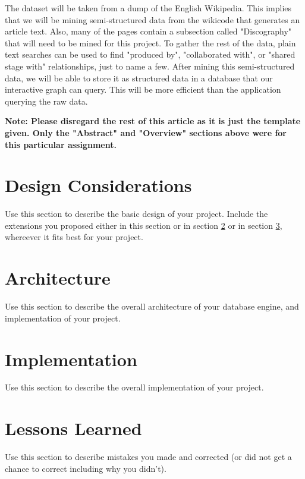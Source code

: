 \documentclass{sig-alternate}
\begin{document}
The dataset will be taken from a dump of the English Wikipedia. This implies 
that we will be mining semi-structured data from the wikicode that generates an 
article text. Also, many of the pages contain a subsection called "Discography" 
that will need to be mined for this project. To gather the rest of the data, 
plain text searches can be used to find "produced by", "collaborated with", 
or "shared stage with" relationships, just to name a few. After mining this 
semi-structured data, we will be able to store it as structured data in a database 
that our interactive graph can query. This will be more efficient than the 
application querying the raw data. 


{\bf Note: Please disregard the rest of this article as it is just
the template given. Only the "Abstract" and "Overview" sections above were 
for this particular assignment.}


\section{Design Considerations}
\label{design considerations}

Use this section to describe the basic design of your project. Include
the extensions you proposed either in this section or in section
\ref{architecture} or in section \ref{implementation}, whereever it
fits best for your project.

\section{Architecture}
\label{architecture}

Use this section to describe the overall architecture of your database
engine, and implementation of your
project.

\section{Implementation}
\label{implementation}

Use this section to describe the overall implementation of your
project.

\section{Lessons Learned}
\label{mistakes}

Use this section to describe mistakes you made and corrected (or did
not get a chance to correct including why you didn't).
\end{document}
